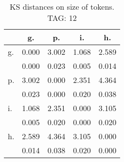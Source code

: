 \begin{table}[h!]
\begin{center}
\begin{tabular}{| l | c | c | c | c |}\hline
 & g. & p. & i. & h. \\\hline
g. & 0.000  & 3.002  & 1.068  & 2.589 \\\hline
 & 0.000  & 0.023  & 0.005  & 0.014 \\\hline
p. & 3.002  & 0.000  & 2.351  & 4.364 \\\hline
 & 0.023  & 0.000  & 0.020  & 0.038 \\\hline
i. & 1.068  & 2.351  & 0.000  & 3.105 \\\hline
 & 0.005  & 0.020  & 0.000  & 0.020 \\\hline
h. & 2.589  & 4.364  & 3.105  & 0.000 \\\hline
 & 0.014  & 0.038  & 0.020  & 0.000 \\\hline
\end{tabular}
\caption{KS distances on size of tokens. TAG: 12}
\end{center}
\end{table}